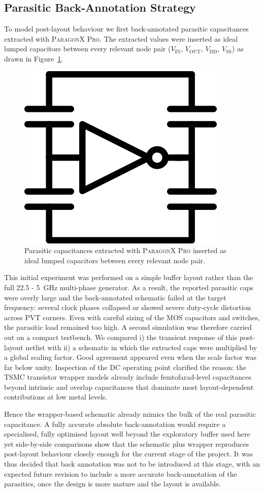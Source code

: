 \subsection{Parasitic Back-Annotation Strategy}

To model post-layout behaviour we first back-annotated parasitic capacitances extracted with \textsc{ParagonX Pro}.%
The extracted values were inserted as ideal lumped capacitors between every relevant node pair (\(V_\text{IN}\), \(V_\text{OUT}\), \(V_\text{DD}\), \(V_\text{SS}\)) as drawn in Figure~\ref{fig:back_annotation}.

\begin{figure}[htbp]
  \centering
  \includegraphics[width=0.15\linewidth]{figures/Schematics/BackAnnotation.png}
  \caption{Parasitic capacitances extracted with \textsc{ParagonX Pro} inserted as ideal lumped capacitors between every relevant node pair.}
  \label{fig:back_annotation}
\end{figure}

This initial experiment was performed on a simple buffer layout rather than the full 22.5 - 5~GHz multi-phase generator.
As a result, the reported parasitic caps were overly large and the back-annotated schematic failed at the target frequency: several clock phases collapsed or showed severe duty-cycle distortion across PVT corners.
Even with careful sizing of the MOS capacitors and switches, the parasitic load remained too high.
A second simulation was therefore carried out on a compact testbench.  
We compared i) the transient response of this post-layout netlist with ii) a schematic in which the extracted caps were multiplied by a global scaling factor.  
Good agreement appeared even when the scale factor was far below unity.  
Inspection of the DC operating point clarified the reason: the TSMC transistor wrapper models already include femtofarad-level capacitances beyond intrinsic and overlap capacitances that dominate most layout-dependent contributions at low metal levels.

Hence the wrapper-based schematic already mimics the bulk of the real parasitic capacitance.  
A fully accurate absolute back-annotation would require a specialised, fully optimised layout well beyond the exploratory buffer used here yet side-by-side comparisons show that the schematic plus wrapper reproduces post-layout behaviour closely enough for the current stage of the project.
It was thus decided that back annotation was not to be introduced at this stage, with an expected future revision to include a more accurate back-annotation of the parasitics, once the design is more mature and the layout is available.

